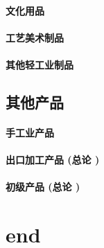 \documentclass[UTF8]{../../RepresentationUniverse}
\begin{document}
    \subsubsection{文化用品}
    \subsubsection{工艺美术制品}
    \subsubsection{其他轻工业制品}
\section{其他产品}
    \subsubsection{手工业产品}
    \subsubsection{出口加工产品 (总论 )}
    \subsubsection{初级产品 (总论 )}


\chapter{end}
\end{document}
